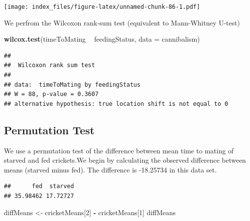 \documentclass[]{article}
\newenvironment{Shaded}{\begin{snugshade}}{\end{snugshade}}
\newcommand{\CommentTok}[1]{\textcolor[rgb]{0.56,0.35,0.01}{\textit{#1}}}
\newcommand{\DataTypeTok}[1]{\textcolor[rgb]{0.13,0.29,0.53}{#1}}
\newcommand{\DecValTok}[1]{\textcolor[rgb]{0.00,0.00,0.81}{#1}}
\newcommand{\KeywordTok}[1]{\textcolor[rgb]{0.13,0.29,0.53}{\textbf{#1}}}
\newcommand{\NormalTok}[1]{#1}
\newcommand{\OperatorTok}[1]{\textcolor[rgb]{0.81,0.36,0.00}{\textbf{#1}}}
\newcommand{\StringTok}[1]{\textcolor[rgb]{0.31,0.60,0.02}{#1}}
\begin{document}
\texttt{[image: index\_files/figure-latex/unnamed-chunk-86-1.pdf]}

We perfrom the Wilcoxon rank-sum test (equivalent to Mann-Whitney
U-test)

\begin{Shaded}
\begin{Highlighting}[]
\KeywordTok{wilcox.test}\NormalTok{(timeToMating }\OperatorTok{~}\StringTok{ }\NormalTok{feedingStatus, }\DataTypeTok{data =}\NormalTok{ cannibalism)}
\end{Highlighting}
\end{Shaded}

\begin{verbatim}
## 
##  Wilcoxon rank sum test
## 
## data:  timeToMating by feedingStatus
## W = 88, p-value = 0.3607
## alternative hypothesis: true location shift is not equal to 0
\end{verbatim}

\hypertarget{permutation-test}{%
\subsection{Permutation Test}\label{permutation-test}}

We use a permutation test of the difference between mean time to mating
of starved and fed crickets.We begin by calculating the observed
difference between means (starved minus fed). The difference is
-18.25734 in this data set.

\begin{Shaded}
\end{Shaded}

\begin{verbatim}
##      fed  starved 
## 35.98462 17.72727
\end{verbatim}

\begin{Shaded}
\begin{Highlighting}[]
\NormalTok{diffMeans <-}\StringTok{ }\NormalTok{cricketMeans[}\DecValTok{2}\NormalTok{] }\OperatorTok{-}\StringTok{ }\NormalTok{cricketMeans[}\DecValTok{1}\NormalTok{]}
\NormalTok{diffMeans}
\end{Highlighting}
\end{Shaded}
\end{document}
